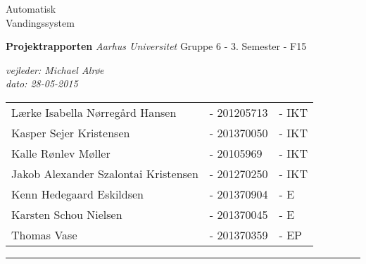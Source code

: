 \begin{titlingpage}

\noindent
\titlefont Automatisk \\[0.7\baselineskip] Vandingssystem\par
\epigraph{
\textbf{Projektrapporten}\newline
\textit{Aarhus Universitet}\newline
Gruppe 6 - 3. Semester - F15\newline
}%
{\textit{vejleder: Michael Alrøe}\\
\textit{dato: 28-05-2015}}
\null\vfill
\vspace*{1cm}
\noindent

\begin{minipage}{0.64\linewidth}
    \begin{flushleft}
		\normalsize
		\begin{tabular}{l l l}
			  Lærke Isabella Nørregård Hansen 		&- 201205713 	&- IKT \\
			  Kasper Sejer Kristensen				&- 201370050	&- IKT \\
			  Kalle Rønlev Møller					&- 20105969		&- IKT \\
			  Jakob Alexander Szalontai Kristensen	&- 201270250	&- IKT \\
			  Kenn Hedegaard Eskildsen				&- 201370904	&- E   \\
			  Karsten Schou Nielsen					&- 201370045	&- E   \\
			  Thomas Vase							&- 201370359	&- EP
		\end{tabular}
    \end{flushleft}
\end{minipage}
%
\begin{minipage}{0.02\linewidth}
    \rule{1pt}{90pt}
\end{minipage}
\titlepagedecoration
\end{titlingpage}
